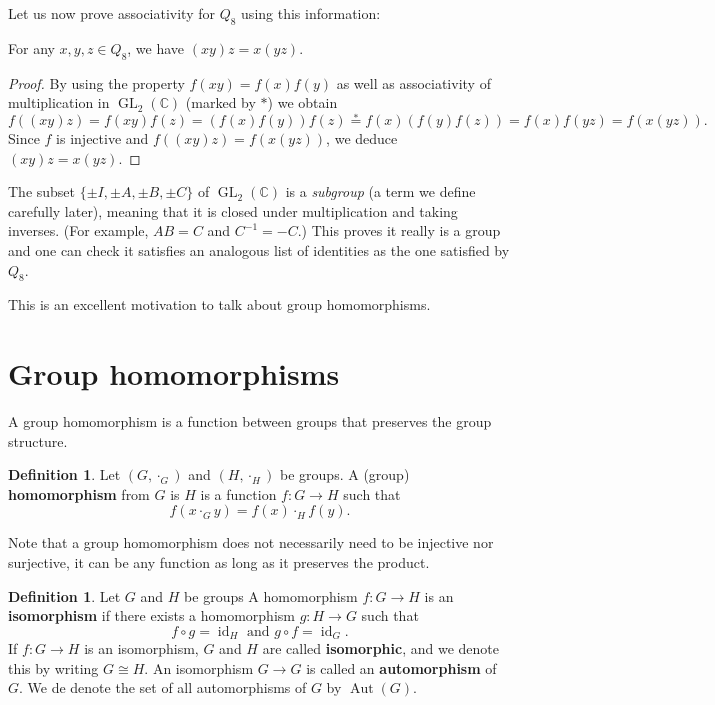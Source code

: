 \documentclass[12pt]{report}
\numberwithin{equation}{section}
\numberwithin{theorem}{chapter}
\theoremstyle{definition}
\newtheorem{definition}[theorem]{Definition}
\newtheorem*{basic properties}{Basic Properties}
\newtheorem*{Important Remark}{Important Remark}
\newcommand{\df}[1]{{\bf #1}\index{#1}}
\DeclareMathOperator{\GL}{GL}
\newcommand{\C}{\mathbb{C}}
\DeclareMathOperator{\id}{id}
\DeclareMathOperator{\Aut}{Aut}
\begin{document}
Let us now prove associativity for $Q_8$ using this information:
\smallskip

 For any $x,y,z\in Q_8$, we have $(xy)z=x(yz)$.
\begin{proof}
By using the property $f(xy)=f(x)f(y)$ as well as associativity of multiplication in $\GL_2(\C)$ (marked by $*$) we obtain
$$f((xy)z)=f(xy)f(z)=\left(f(x)f(y)\right)f(z)\stackrel{*}{=}f(x)\left(f(y)f(z)\right)=f(x)f(yz)=f(x(yz)).$$
Since $f$ is injective and $f((xy)z)=f(x(yz))$, we deduce  $(xy)z=x(yz)$.
\end{proof}


The subset $\{\pm I, \pm A, \pm B, \pm C\}$ of $\GL_2(\C)$ is a {\em subgroup} (a term we
define carefully later), meaning that it is closed under multiplication and taking inverses. (For example, $AB= C$ and $C^{-1} = -C$.) This proves it really is a group
and one can check it satisfies an analogous  list of identities as the one satisfied by $Q_8$.  



\vspace{1em}


This is an excellent motivation to talk about group homomorphisms.




\section{Group homomorphisms}



A group homomorphism is a function between groups that preserves the group structure.

\begin{definition}
Let $(G, \cdot_G)$ and $(H, \cdot_H)$ be groups.
A (group) {\bf homomorphism} from $G$ is $H$ is a function $f: G \to H$ such that 
$$f(x \cdot_G y) = f(x) \cdot_H f(y).$$
\end{definition}

Note that a group homomorphism does not necessarily need to be injective nor surjective, it can be any function as long as it preserves the product.

\begin{definition}\label{def:gpiso}\index{$\Aut(G)$}
Let $G$ and $H$ be groups A homomorphism $f\!: G \to H$ is an \df{isomorphism} if there exists a homomorphism $g: H \to G$ such that 
$$f \circ g = \id_H \textrm{ and } g \circ f = \id_G.$$
If $f:G\to H$ is an isomorphism, $G$ and $H$ are called {\bf isomorphic}, and we denote this by writing $G\cong H$. An isomorphism $G \longrightarrow G$ is called an \df{automorphism} of $G$. We de denote the set of all automorphisms of $G$ by $\Aut(G)$.
\end{definition}
 
\end{document}
